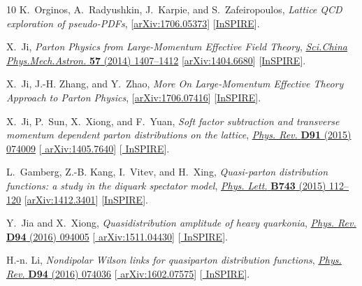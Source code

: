 \begin{thebibliography}{10}
K.~Orginos, A.~Radyushkin, J.~Karpie, and S.~Zafeiropoulos,
{\it {Lattice QCD exploration of pseudo-PDFs}},
  [\href{http://arxiv.org/abs/1706.05373}{{\ttfamily arXiv:1706.05373}}]
  [\href{http://inspirehep.net/record/1605575}{{\ttfamily InSPIRE}}].

X.~Ji, {\it {Parton Physics from Large-Momentum Effective Field Theory}},
\href{http://dx.doi.org/10.1007/s11433-014-5492-3}{{\em Sci.China
  Phys.Mech.Astron.} {\bfseries 57} (2014) 1407--1412}
  [\href{http://arxiv.org/abs/1404.6680}{{\ttfamily arXiv:1404.6680}}]
  [\href{http://inspirehep.net/record/1292804}{{\ttfamily InSPIRE}}].

X.~Ji, J.-H. Zhang, and Y.~Zhao,
{\it {More On Large-Momentum Effective Theory Approach to Parton Physics}},
  [\href{http://arxiv.org/abs/1706.07416}{{\ttfamily arXiv:1706.07416}}]
  [\href{http://inspirehep.net/record/1606344}{{\ttfamily InSPIRE}}].

X.~Ji, P.~Sun, X.~Xiong, and F.~Yuan, {\it {Soft factor subtraction and
  transverse momentum dependent parton distributions on the lattice}},
\href{http://dx.doi.org/10.1103/PhysRevD.91.074009}{{\em Phys. Rev.} {\bfseries
  D91} (2015) 074009} [\href{http://arxiv.org/abs/1405.7640}{{\ttfamily
  arXiv:1405.7640}}] [\href{http://inspirehep.net/record/1298525}{{\ttfamily
  InSPIRE}}].

L.~Gamberg, Z.-B. Kang, I.~Vitev, and H.~Xing, {\it {Quasi-parton distribution
  functions: a study in the diquark spectator model}},
\href{http://dx.doi.org/10.1016/j.physletb.2015.02.021}{{\em Phys. Lett.}
  {\bfseries B743} (2015) 112--120}
  [\href{http://arxiv.org/abs/1412.3401}{{\ttfamily arXiv:1412.3401}}]
  [\href{http://inspirehep.net/record/1333669}{{\ttfamily InSPIRE}}].

Y.~Jia and X.~Xiong, {\it {Quasidistribution amplitude of heavy quarkonia}},
\href{http://dx.doi.org/10.1103/PhysRevD.94.094005}{{\em Phys. Rev.} {\bfseries
  D94} (2016) 094005} [\href{http://arxiv.org/abs/1511.04430}{{\ttfamily
  arXiv:1511.04430}}] [\href{http://inspirehep.net/record/1404098}{{\ttfamily
  InSPIRE}}].

H.-n. Li, {\it {Nondipolar Wilson links for quasiparton distribution
  functions}},
\href{http://dx.doi.org/10.1103/PhysRevD.94.074036}{{\em Phys. Rev.} {\bfseries
  D94} (2016) 074036} [\href{http://arxiv.org/abs/1602.07575}{{\ttfamily
  arXiv:1602.07575}}] [\href{http://inspirehep.net/record/1423310}{{\ttfamily
  InSPIRE}}].


\end{thebibliography}
